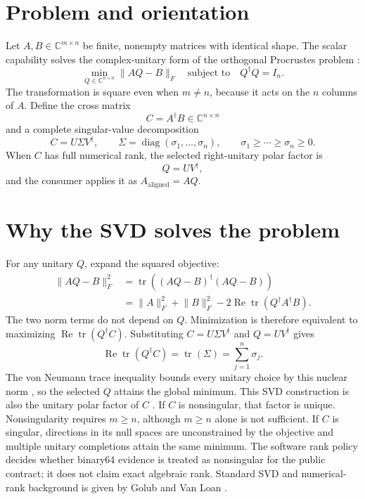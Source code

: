 \section{Problem and orientation}
Let $A,B\in\mathbb{C}^{m\times n}$ be finite, nonempty matrices with identical shape.
The scalar capability solves the complex-unitary form of the orthogonal Procrustes
problem \cite{Schonemann1966,GowerDijksterhuis2004}:
\[
  \min_{Q\in\mathbb{C}^{n\times n}}\lVert AQ-B\rVert_F
  \quad\text{subject to}\quad Q^\dagger Q=I_n.
\]
The transformation is square even when $m\ne n$, because it acts on the $n$ columns of
$A$. Define the cross matrix
\[
  C=A^\dagger B\in\mathbb{C}^{n\times n}
\]
and a complete singular-value decomposition
\[
  C=U\Sigma V^\dagger,
  \qquad
  \Sigma=\operatorname{diag}(\sigma_1,\ldots,\sigma_n),
  \qquad
  \sigma_1\ge\cdots\ge\sigma_n\ge0.
\]
When $C$ has full numerical rank, the selected right-unitary polar factor is
\[
  Q=UV^\dagger,
\]
and the consumer applies it as $A_{\mathrm{aligned}}=AQ$.

\section{Why the SVD solves the problem}
For any unitary $Q$, expand the squared objective:
\begin{align*}
  \lVert AQ-B\rVert_F^2
  &=\operatorname{tr}\!\left((AQ-B)^\dagger(AQ-B)\right)\\
  &=\lVert A\rVert_F^2+\lVert B\rVert_F^2
    -2\operatorname{Re}\operatorname{tr}\!\left(Q^\dagger A^\dagger B\right).
\end{align*}
The two norm terms do not depend on $Q$. Minimization is therefore equivalent to
maximizing $\operatorname{Re}\operatorname{tr}(Q^\dagger C)$. Substituting
$C=U\Sigma V^\dagger$ and $Q=UV^\dagger$ gives
\[
  \operatorname{Re}\operatorname{tr}(Q^\dagger C)
  =\operatorname{tr}(\Sigma)=\sum_{j=1}^{n}\sigma_j.
\]
The von Neumann trace inequality bounds every unitary choice by this nuclear norm
\cite{Bhatia1997}, so the selected $Q$ attains the global minimum. This SVD construction
is also the unitary polar factor of $C$ \cite{Higham1986Polar}. If $C$ is nonsingular,
that factor is unique. Nonsingularity requires $m\ge n$, although $m\ge n$ alone is not
sufficient. If $C$ is singular, directions in its null spaces are unconstrained by the
objective and multiple unitary completions attain the same minimum. The software
rank policy decides whether binary64 evidence is treated as nonsingular for the public
contract; it does not claim exact algebraic rank. Standard SVD and numerical-rank
background is given by Golub and Van Loan \cite{GolubVanLoan2013}.

